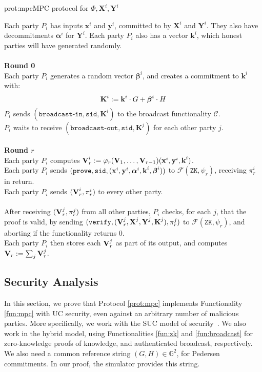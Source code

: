 \begin{aprotocol}{prot:mpc}{MPC protocol for $\Phi, \textbf{X}^i, \textbf{Y}^i$}

Each party $P_i$ has inputs $\textbf{x}^i$ and $\textbf{y}^i$, committed to
by $\textbf{X}^i$ and $\textbf{Y}^i$.
They also have decommitments $\boldsymbol{\alpha}^i$ for $\textbf{Y}^i$.
Each party $P_i$ also has a vector $\textbf{k}^i$, which honest parties will
have generated randomly.\\
\\
\textbf{Round 0}\\
Each party $P_i$ generates a random vector $\boldsymbol{\beta}^i$, and creates
a commitment to $\textbf{k}^i$ with:
$$
\textbf{K}^i := \textbf{k}^i \cdot G + \boldsymbol{\beta}^i \cdot H
$$
$P_i$ sends $(\texttt{broadcast-in}, \texttt{sid}, \textbf{K}^i)$ to
the broadcast functionality $\mathcal{C}$.\\
$P_i$ waits to receive $(\texttt{broadcast-out}, \texttt{sid}, \textbf{K}^j)$
for each other party $j$.\\
\\
\textbf{Round $r$}\\
Each party $P_i$ computes $\textbf{V}^i_r := \varphi_r(\textbf{V}_1, \ldots, \textbf{V}_{r - 1})(\textbf{x}^i, \textbf{y}^i, \textbf{k}^i)$.\\
Each party $P_i$ sends $(\texttt{prove}, \texttt{sid}, (\textbf{x}^i, \textbf{y}^i, \boldsymbol{\alpha}^i, \textbf{k}^i, \boldsymbol{\beta}^i))$
to $\mathcal{F}(\texttt{ZK}, \psi_r)$, receiving $\pi^i_r$ in return.\\
Each party $P_i$ sends $(\textbf{V}^i_r, \pi^i_r)$ to every other party.\\
\\
After receiving $(\textbf{V}^j_r, \pi^j_r)$  from all other parties, $P_i$ checks,
for each $j$, that the proof is valid, by sending $(\texttt{verify}, (\textbf{V}^j_r, \textbf{X}^j, \textbf{Y}^j, \textbf{K}^j), \pi^j_r)$ to
$\mathcal{F}(\texttt{ZK}, \psi_r)$, and aborting if the functionality returns $0$.\\
Each party $P_i$ then stores each $\textbf{V}^j_r$ as part of its output,
and computes $\textbf{V}_r := \sum_j \textbf{V}^j_r$.
\end{aprotocol}

\subsection{Security Analysis}

In this section, we prove that Protocol \ref{prot:mpc} implements
Functionality \ref{fun:mpc} with UC security, even against an arbitrary
number of malicious parties.
More specifically, we work with the SUC model of security~\cite{canetti_simpler_2015}.
We also work in the hybrid model, using Functionalities
\ref{fun:zk} and \ref{fun:broadcast} for zero-knowledge proofs of knowledge,
and authenticated broadcast, respectively.
We also need a common reference string $(G, H) \in \mathbb{G}^2$, for
Pedersen commitments.
In our proof, the simulator provides this string.

